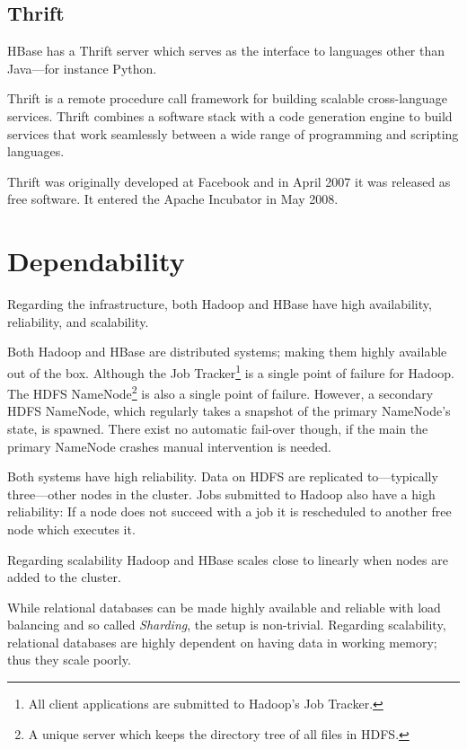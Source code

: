 \subsection*{Thrift}

HBase has a Thrift server which serves as the interface to languages other than
Java---for instance Python.

Thrift is a remote procedure call framework for building scalable cross-language
services. Thrift combines a software stack with a code generation engine to
build services that work seamlessly between a wide range of programming and
scripting languages.

Thrift was originally developed at Facebook and in April 2007 it was released as
free software. It entered the Apache Incubator in May 2008. \cite{thrift}


\section{Dependability}

Regarding the infrastructure, both Hadoop and HBase have high availability,
reliability, and scalability.

Both Hadoop and HBase are distributed systems; making them highly available out
of the box. Although the Job Tracker\footnote{All client applications are
submitted to Hadoop's Job Tracker.} is a single point of failure for Hadoop.
The HDFS NameNode\footnote{A unique server which keeps the directory tree of all
files in HDFS.} is also a single point of failure. However, a secondary HDFS
NameNode, which regularly takes a snapshot of the primary NameNode's state, is
spawned. There exist no automatic fail-over though, if the main the primary
NameNode crashes manual intervention is needed.

Both systems have high reliability. Data on HDFS are replicated to---typically
three---other nodes in the cluster. Jobs submitted to Hadoop also have a high
reliability: If a node does not succeed with a job it is rescheduled to another
free node which executes it.

Regarding scalability Hadoop and HBase scales close to linearly when nodes are
added to the cluster.

While relational databases can be made highly available and reliable with load
balancing and so called \textit{Sharding}, the setup is non-trivial. Regarding
scalability, relational databases are highly dependent on having data in working
memory; thus they scale poorly.




